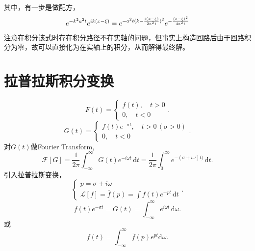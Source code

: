 \documentclass[12pt,a4paper,openany,twoside]{book}
\numberwithin{equation}{section}
\begin{document}
        其中，有一步是做配方，
        \begin{equation*}
          e^{-k^2a^2t}e^{ik\qty(x-\xi)}=e^{-a^2t(k-\frac{i\qty(x-\xi)}{2a^2t})^2}e^{-\frac{\qty(x-\xi)^2}{4a^2t}}
        \end{equation*} 
        注意在积分该式时存在积分路径不在实轴的问题，但事实上构造回路后由于回路积分为零，故可以直接化为在实轴上的积分，从而解得最终解。

      \section{拉普拉斯积分变换}
        \begin{equation}
          F(t) = 
          \begin{cases}
            f(t),\quad t>0 \\
            0, \quad t<0
          \end{cases}
        .
        \end{equation} 
        \begin{equation}
          G(t) =
          \begin{cases}
          f(t)e^{-\sigma t}, \quad t>0 \,(\sigma > 0) \\
          0, \quad t<0
          \end{cases}
        .
        \end{equation} 
        对$G(t)$做Fourier Transform,
        \begin{equation}
          \mathcal{F}[G] = \frac{1}{2\pi} \int _{-\infty}^{\infty}G(t) e^{-i\omega t} \, \mathrm{d}t = \frac{1}{2\pi} \int _0^\infty e^{-(\sigma + i \omega) t)} \, \mathrm{d}t  
        .
        \end{equation} 
        引入拉普拉斯变换，
        \begin{equation}
        \begin{cases}
          p = \sigma + i \omega \\
          \mathcal{L}[f] = \overline{f}(p) = \int f(t) e^{-pt} \, \mathrm{d}t 
        \end{cases}
        .
        \end{equation} 
        \begin{equation}
          f(t)e^{-\sigma t} = G(t) = \int _{-\infty} ^ {\infty} e^{i\omega t} \, \mathrm{d}\omega 
        .
        \end{equation} 
        或
        \begin{equation}
          f(t) = \int_{-\infty}^{\infty} \overline{f}(p) e^{pt} \mathrm{d}\omega
        .
        \end{equation} 
\end{document}
